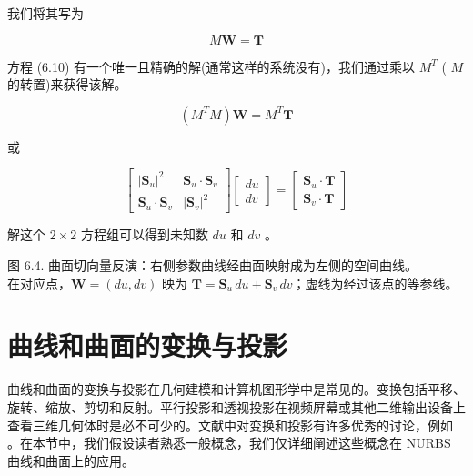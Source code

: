 \documentclass[../main.tex]{subfiles}
\begin{document}
我们将其写为

\[
M\mathbf{W} = \mathbf{T}
\]

方程 (6.10) 有一个唯一且精确的解(通常这样的系统没有)，我们通过乘以 \({M}^{T}\) ( \(M\) 的转置)来获得该解。

\[
\left( {{M}^{T}M}\right) \mathbf{W} = {M}^{T}\mathbf{T}
\]



或

\[
\left\lbrack  \begin{array}{ll} {\left| {\mathbf{S}}_{u}\right| }^{2} & {\mathbf{S}}_{u} \cdot  {\mathbf{S}}_{v} \\  {\mathbf{S}}_{u} \cdot  {\mathbf{S}}_{v} & {\left| {\mathbf{S}}_{v}\right| }^{2} \end{array}\right\rbrack  \left\lbrack  \begin{array}{l} {du} \\  {dv} \end{array}\right\rbrack   = \left\lbrack  \begin{array}{l} {\mathbf{S}}_{u} \cdot  \mathbf{T} \\  {\mathbf{S}}_{v} \cdot  \mathbf{T} \end{array}\right\rbrack   \tag{6.11}
\]

解这个 \(2 \times  2\) 方程组可以得到未知数 \({du}\) 和 \({dv}\) 。



\begin{center}
\begin{minipage}{25cm}
\vspace*{.6\baselineskip}
\centering
{}
\par\smallskip
图 6.4. 曲面切向量反演：右侧参数曲线经曲面映射成为左侧的空间曲线。\\
在对应点，$\mathbf W=(du,dv)$ 映为 $\mathbf T=\mathbf S_u\,du+\mathbf S_v\,dv$；虚线为经过该点的等参线。
\end{minipage}
\end{center}

\section{曲线和曲面的变换与投影}

曲线和曲面的变换与投影在几何建模和计算机图形学中是常见的。变换包括平移、旋转、缩放、剪切和反射。平行投影和透视投影在视频屏幕或其他二维输出设备上查看三维几何体时是必不可少的。文献中对变换和投影有许多优秀的讨论，例如 \cite{Faux81,Fole90,Roge90}。在本节中，我们假设读者熟悉一般概念，我们仅详细阐述这些概念在 NURBS 曲线和曲面上的应用。
\end{document}
